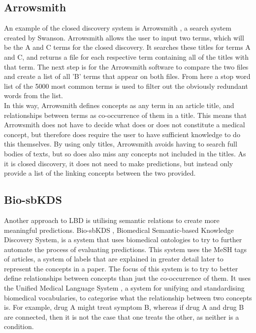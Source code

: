\documentclass{l4proj}
\begin{document}
\subsection{Arrowsmith}

An example of the closed discovery system is Arrowsmith \citep{swanson_interactive_1997}, a search system created by Swanson. Arrowsmith allows the user to input two terms, which will be the A and C terms for the closed discovery. It searches these titles for terms A and C, and returns a file for each respective term containing all of the titles with that term. The next step is for the Arrowsmith software to compare the two files and create a list of all 'B' terms that appear on both files. From here a stop word list of the 5000 most common terms is used to filter out the obviously redundant words from the list. \\

In this way, Arrowsmith defines concepts as any term in an article title, and relationships between terms as co-occurrence of them in a title. This means that Arrowsmith does not have to decide what does or does not constitute a medical concept, but therefore does require the user to have sufficient knowledge to do this themselves. By using only titles, Arrowsmith avoids having to search full bodies of texts, but so does also miss any concepts not included in the titles. As it is closed discovery, it does not need to make predictions, but instead only provide a list of the linking concepts between the two provided. \\

\subsection{Bio-sbKDS}

Another approach to LBD is utilising semantic relations to create more meaningful predictions. Bio-sbKDS \citep{hu_semantic-based_2005}, Biomedical Semantic-based Knowledge Discovery System, is a system that uses biomedical ontologies to try to further automate the process of evaluating predictions. This system uses the MeSH tags of articles, a system of labels that are explained in greater detail later to represent the concepts in a paper. The focus of this system is to try to better define relationships between concepts than just the co-occurrence of them. It uses the Unified Medical Language System \citep{umls}, a system for unifying and standardising biomedical vocabularies, to categorise what the relationship between two concepts is. For example, drug A might treat symptom B, whereas if drug A and drug B are connected, then it is not the case that one treats the other, as neither is a condition. \\
\end{document}
